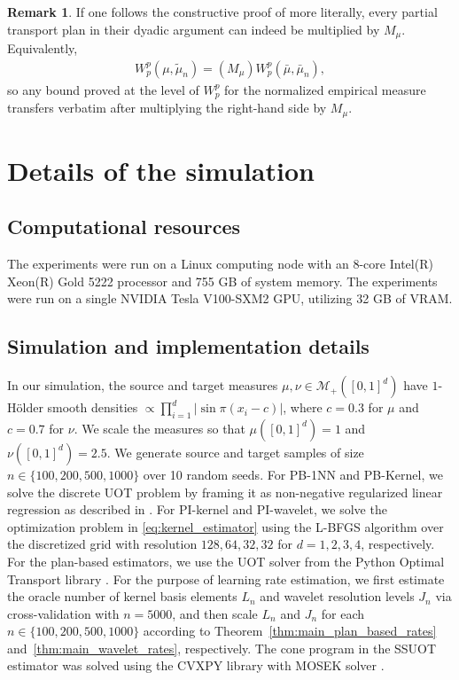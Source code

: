\documentclass[11pt,reqno]{amsart}
\theoremstyle{definition}
\newtheorem{remark}{Remark}
\renewcommand{\tilde}{\widetilde}
\newcommand{\mM}{\mathcal{M}}
\begin{document}
\begin{remark}
If one follows the constructive proof of \cite{weed2019sharp} more literally, every partial transport plan in their dyadic argument can indeed be multiplied by $M_\mu$.
Equivalently,
\begin{align}
    W_p^p(\mu,\tilde\mu_n) = (M_\mu) W_p^p(\bar\mu,\bar\mu_n),
\end{align}
so any bound proved at the level of $W_p^p$ for the normalized empirical measure transfers verbatim after multiplying the right-hand side by $M_\mu$.
\end{remark}

\section{Details of the simulation} 

\subsection{Computational resources}\label{sec:comp}
The experiments were run on a Linux computing node with an 8-core Intel(R) Xeon(R) Gold 5222 processor and 755 GB of system memory. The experiments were run on a single NVIDIA Tesla V100-SXM2 GPU, utilizing 32 GB of VRAM.

\subsection{Simulation and implementation details}\label{sec:sim_detail}
In our simulation, the source and target measures $\mu,\nu \in \mM_+([0,1]^d)$ have $1$-Hölder smooth densities $\propto \prod_{i=1}^d \lvert \sin \pi(x_i-c)\rvert$, where $c=0.3$ for $\mu$ and $c=0.7$ for $\nu$. We scale the measures so that $\mu([0,1]^d)=1$ and $\nu([0,1]^d)=2.5$. We generate source and target samples of size $n\in \{100,200,500,1000\}$ over 10 random seeds. For PB-1NN and PB-Kernel, we solve the discrete UOT problem by framing it as non-negative regularized linear regression as described in \cite{Chapel2021}. For PI-kernel and PI-wavelet, we solve the optimization problem in \eqref{eq:kernel_estimator} using the L-BFGS algorithm \cite{Liu1989} over the discretized grid with resolution $128, 64, 32, 32$ for $d=1,2,3,4$, respectively. For the plan-based estimators, we use the UOT solver from the Python Optimal Transport library \cite{flamary2021pot}. For the purpose of learning rate estimation, we first estimate the oracle number of kernel basis elements $L_n$ and wavelet resolution levels $J_n$ via cross-validation with $n=5000$, and then scale $L_n$ and $J_n$ for each $n\in \{100,200,500,1000\}$ according to Theorem~\ref{thm:main_plan_based_rates} and~\ref{thm:main_wavelet_rates}, respectively. The cone program in the SSUOT estimator was solved using the CVXPY library \cite{diamond2016cvxpy} with MOSEK solver \cite{mosek}.



\end{document}
